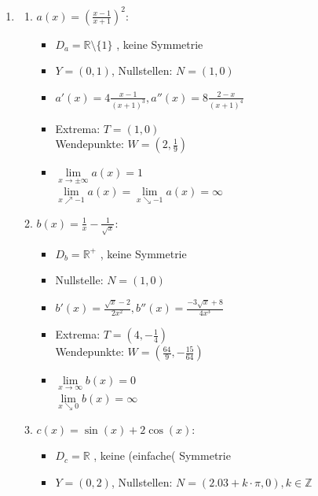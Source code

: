 \begin{enumerate}
    \item 
          \begin{enumerate}
              \item \( a(x) = \left( \frac{x - 1}{x + 1} \right)^2 \):
                    \begin{itemize}
                        \item $D_a = \mathbb{R} \setminus \{1\}$ , keine Symmetrie
                        \item $Y = (0, 1)$, Nullstellen: $N = (1,0)$
                        \item $a'(x) = 4 \frac{x-1}{(x+1)^3}, a''(x) =  8 \frac{2-x}{(x+1)^4}$
                        \item Extrema: $T=(1, 0)$ \\
                              Wendepunkte: $W = (2, \frac{1}{9})$
                        \item $\lim\limits_{x \to \pm\infty} a(x) = 1$ \\
                              $\lim\limits_{x \nearrow -1} a(x) = \lim\limits_{x \searrow -1} a(x)=\infty $
                    \end{itemize}
              \item \( b(x) = \frac{1}{x} - \frac{1}{\sqrt{x}} \):
                    \begin{itemize}
                        \item $D_b = \mathbb{R}^+ $ , keine Symmetrie
                        \item Nullstelle: $N = (1,0)$
                        \item $b'(x) = \frac{\sqrt{x}-2}{2x^2}, b''(x) =  \frac{-3\sqrt{x}+8}{4x^3}$
                        \item Extrema: $T=(4, -\frac{1}{4})$ \\
                              Wendepunkte: $W = (\frac{64}{9}, -\frac{15}{64})$
                        \item $\lim\limits_{x \to \infty} b(x) = 0$ \\
                              $\lim\limits_{x \searrow 0} b(x)=\infty $
                    \end{itemize}
              \item \( c(x) = \sin(x) + 2\cos(x) \):
                    \begin{itemize}
                        \item $D_c = \mathbb{R}$ , keine (einfache( Symmetrie
                        \item $Y = (0, 2)$, Nullstellen: $N = (2.03 +k\cdot \pi,0), k\in \mathbb{Z}$

\end{itemize}
\end{enumerate}
\end{enumerate}
